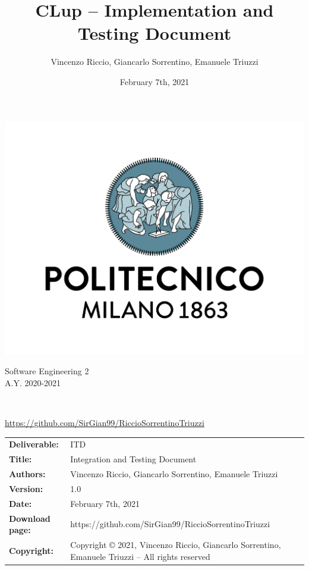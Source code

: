 \documentclass[a4paper,oneside,11pt]{book}
\title{\LARGE{CLup -- Implementation and Testing Document}}
\author{Vincenzo Riccio, Giancarlo Sorrentino, Emanuele Triuzzi}
\date{February 7th, 2021}
\begin{document}
\begin{titlingpage} 
    \begin{center}
        \includegraphics[height=0.52\linewidth]{pictures/polimi}\\ %
        \begin{large}
            Software Engineering 2 \\
            A.Y. 2020-2021\\
        \end{large}
        \vspace{4cm} %
        \begin{large} 
            \textbf{\thetitle} \\
        \end{large}
        \vspace{0.7cm}
        \theauthor
        \par\small{\url{https://github.com/SirGian99/RiccioSorrentinoTriuzzi}} \par\par
        \vspace{7.3cm} %
        \thedate
    \end{center}
\end{titlingpage}

\newpage
\begin{table}[H]
    \begin{tabu} to \textwidth { X[0.3,r,p] X[0.7,l,p] }
        \hline
        \textbf{Deliverable:}   & ITD\\
        \textbf{Title:}         & Integration and Testing Document \\
        \textbf{Authors:}       & Vincenzo Riccio, Giancarlo Sorrentino, \newline Emanuele Triuzzi \\
        \textbf{Version:}       & 1.0 \\ 
        \textbf{Date:}          & February 7th, 2021 \\
        \textbf{Download page:} & https://github.com/SirGian99/RiccioSorrentinoTriuzzi \\
        \textbf{Copyright:}     & Copyright © 2021, Vincenzo Riccio, Giancarlo Sorrentino, Emanuele Triuzzi -- All rights reserved \\
        \hline
    \end{tabu}
\end{table}
\end{document}
